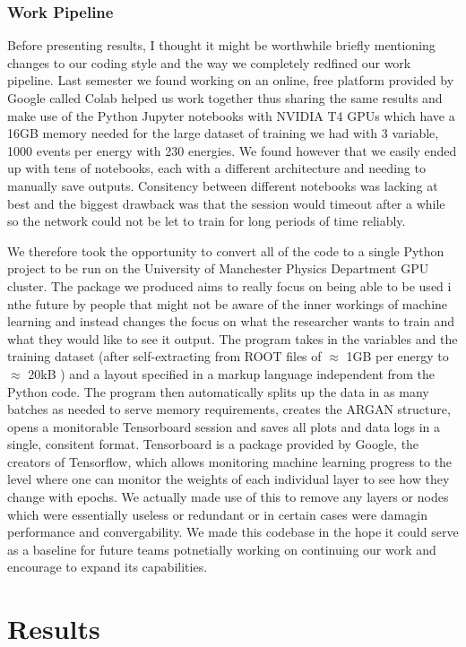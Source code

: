 \documentclass[11pt]{article} %
\begin{document}
\subsubsection{Work Pipeline}
Before presenting results, I thought it might be worthwhile briefly mentioning changes to our
coding style and the way we completely redfined our work pipeline.
Last semester we found working on an online, free platform provided by Google called Colab helped us work together thus sharing the same results
and make use of the Python Jupyter notebooks with NVIDIA T4 GPUs which have a 16GB memory needed for the large dataset of training we had with 3 variable, 1000 events per energy with 230 energies.
We found however that we easily ended up with tens of notebooks, each with a different architecture and needing to manually save outputs.
Consitency between different notebooks was lacking at best and the biggest drawback was that the session would timeout after a while so the network could not
be let to train for long periods of time reliably.
\\
\par We therefore took the opportunity to convert all of the code to a single Python project to be run on the University of Manchester Physics Department GPU cluster.
The package we produced aims to really focus on being able to be used i nthe future by people that might not be aware of the inner workings of machine learning
and instead changes the focus on what the researcher wants to train and what they would like to see it output.
The program takes in the variables and the training dataset (after self-extracting from ROOT files of $\approx$ 1GB per energy to $\approx$ 20kB )
and a layout specified in a markup language independent from the Python code.
The program then automatically splits up the data in as many batches as needed to serve memory requirements, creates the ARGAN structure, opens a monitorable
Tensorboard session and saves all plots and data logs in a single, consitent format.
Tensorboard is a package provided by Google, the creators of Tensorflow, which allows monitoring machine learning progress to the level
where one can monitor the weights of each individual layer to see how they change with epochs.
We actually made use of this to remove any layers or nodes which were essentially useless or redundant or in certain cases were damagin performance and convergability.
We made this codebase in the hope it could serve as a baseline for future teams potnetially working on continuing our work and encourage to expand its capabilities.
\section{Results}
\end{document}
